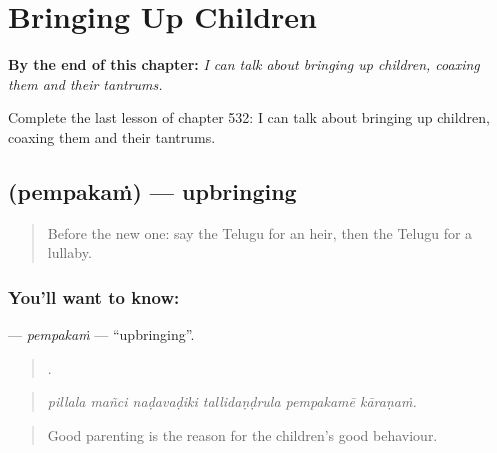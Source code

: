 
\chapter{Bringing Up Children}
\label{ch:te-bringing-up-children}

\begin{chapteropening}
\textbf{By the end of this chapter:} \emph{I can talk about bringing up children, coaxing them and their tantrums.}

Complete the last lesson of chapter 532: I can talk about bringing up children, coaxing them and their tantrums.
\end{chapteropening}

\section[\texorpdfstring{\te{పెంపకం} (pempakaṁ)}{పెంపకం (pempakaṁ)}]{ (pempakaṁ) — upbringing}

\label{lesson:TE-C532-pempakam}



\begin{quote}
Before the new one: say the Telugu for an heir, then the Telugu for a lullaby.
\end{quote}

\subsection*{You'll want to know: }
\textbf{} — \emph{pempakaṁ} — \textquotedblleft{}upbringing\textquotedblright{}.

\begin{quote}
     .
\end{quote}

\begin{quote}
\emph{pillala mañci naḍavaḍiki tallidaṇḍrula pempakamē kāraṇaṁ.}
\end{quote}

\begin{quote}
Good parenting is the reason for the children's good behaviour.
\end{quote}

